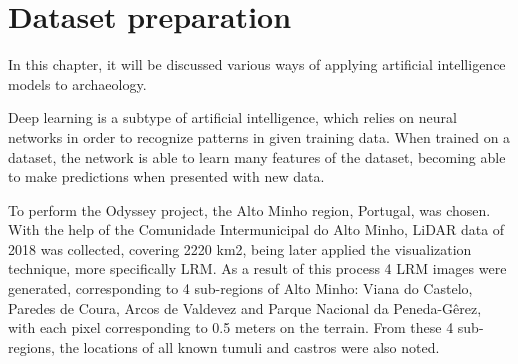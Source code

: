 
\chapter{Dataset preparation}

\begin{introduction}
In this chapter, it will be discussed various ways of applying artificial intelligence models to archaeology.
\end{introduction}





Deep learning is a subtype of artificial intelligence, which relies on neural networks in order to recognize patterns in given training data. When trained on a dataset, the network is able to learn many features of the dataset, becoming able to make predictions when presented with new data.



%
%

To perform the Odyssey project, the Alto Minho region, Portugal, was chosen. With the help of the Comunidade Intermunicipal do Alto Minho, LiDAR data of 2018 was collected, covering 2220 km2, being later applied the visualization technique, more specifically LRM. As a result of this process 4 LRM images were generated, corresponding to 4 sub-regions of Alto Minho: Viana do Castelo, Paredes de Coura, Arcos de Valdevez and Parque Nacional da Peneda-Gêrez, with each pixel corresponding to 0.5 meters on the terrain.
From these 4 sub-regions, the locations of all known tumuli and castros were also noted.

